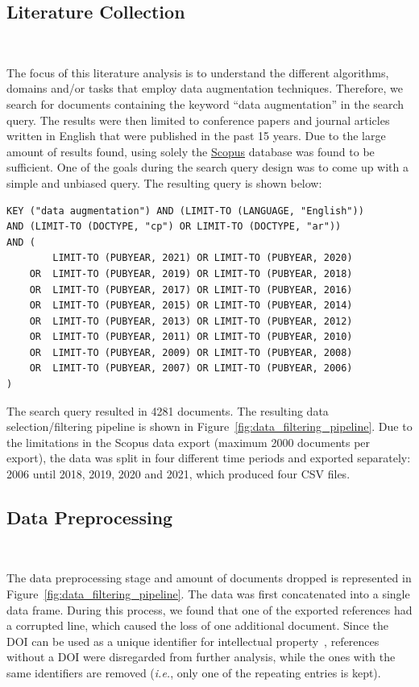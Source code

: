 \documentclass[parskip=full]{scrartcl}
\begin{document}
\subsection{Literature Collection}~\label{sec:lit_collection}

The focus of this literature analysis is to understand the different
algorithms, domains and/or tasks that employ data augmentation techniques.
Therefore, we search for documents containing the keyword ``data
augmentation'' in the search query. The results were then limited to
conference papers and journal articles written in English that were published
in the past 15 years.  Due to the large amount of results found, using solely
the \href{https://www.scopus.com/}{Scopus} database was found to be
sufficient. One of the goals during the search query design was to come up
with a simple and unbiased query. The resulting query is shown below:

\bigskip
\begin{verbatim}
KEY ("data augmentation") AND (LIMIT-TO (LANGUAGE, "English"))  
AND (LIMIT-TO (DOCTYPE, "cp") OR LIMIT-TO (DOCTYPE, "ar"))  
AND (
        LIMIT-TO (PUBYEAR, 2021) OR LIMIT-TO (PUBYEAR, 2020)  
    OR  LIMIT-TO (PUBYEAR, 2019) OR LIMIT-TO (PUBYEAR, 2018)  
    OR  LIMIT-TO (PUBYEAR, 2017) OR LIMIT-TO (PUBYEAR, 2016)  
    OR  LIMIT-TO (PUBYEAR, 2015) OR LIMIT-TO (PUBYEAR, 2014)  
    OR  LIMIT-TO (PUBYEAR, 2013) OR LIMIT-TO (PUBYEAR, 2012)  
    OR  LIMIT-TO (PUBYEAR, 2011) OR LIMIT-TO (PUBYEAR, 2010)  
    OR  LIMIT-TO (PUBYEAR, 2009) OR LIMIT-TO (PUBYEAR, 2008)  
    OR  LIMIT-TO (PUBYEAR, 2007) OR LIMIT-TO (PUBYEAR, 2006) 
)  
\end{verbatim}
\bigskip

The search query resulted in 4281 documents. The resulting data
selection/filtering pipeline is shown in
Figure~\ref{fig:data_filtering_pipeline}. Due to the limitations in the Scopus
data export (maximum 2000 documents per export), the data was split in four
different time periods and exported separately: 2006 until 2018, 2019, 2020
and 2021, which produced four CSV files.

\subsection{Data Preprocessing}~\label{sec:data_preprocessing}

The data preprocessing stage and amount of documents dropped is represented in
Figure~\ref{fig:data_filtering_pipeline}. The data was first concatenated into
a single data frame. During this process, we found that one of the exported
references had a corrupted line, which caused the loss of one additional
document.  Since the DOI can be used as a unique identifier for intellectual
property~\cite{Paskin1999}, references without a DOI were disregarded from
further analysis, while the ones with the same identifiers are removed
(\textit{i.e.}, only one of the repeating entries is kept).
\end{document}
